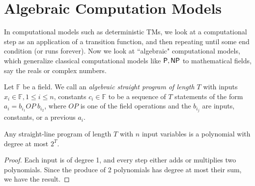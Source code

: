 \section{Algebraic Computation Models}

In computational models such as deterministic TMs, we look at a computational step as an application of a transition function, and then repeating until some end condition (or runs forever). Now we look at ``algebraic" computational models, which generalize classical computational models like ${\mathsf{P}}, {\mathsf{NP}}$ to mathematical fields, say the reals or complex numbers. 

\begin{definition}
Let $\mathbb{F}$ be a field. We call an \emph{algebraic straight program of length $T$} with inputs $x_i \in \mathbb{F}, 1 \le i \le n$, constants $c_i \in \mathbb{F}$ to be a sequence of $T$ statements of the form $a_i = b_{i_1} OP\; b_{i_2}$, where $OP$ is one of the field operations and the $b_{i_j}$ are inputs, constants, or a previous $a_i$. 
\end{definition}

\begin{theorem}
Any straight-line program of length $T$ with $n$ input variables is a polynomial with degree at most $2^T$.
\end{theorem}

\begin{proof}
Each input is of degree 1, and every step either adds or multiplies two polynomials. Since the produce of 2 polynomials has degree at most their sum, we have the result.
\end{proof}